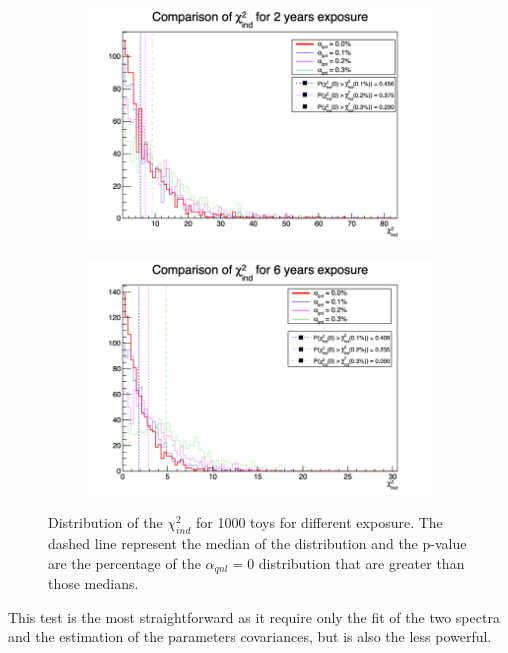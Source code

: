 \documentclass[../main.tex]{subfiles}
\begin{document}
\begin{figure}[th]
  \begin{subfigure}[t]{0.48\linewidth}
    \includegraphics[width=\linewidth]{images/joint_fit/stat_tests/chi2_ind_2y.png}
  \end{subfigure}
  \begin{subfigure}[t]{0.48\linewidth}
    \includegraphics[width=\linewidth]{images/joint_fit/stat_tests/chi2_ind_6y.png}
  \end{subfigure}
  \caption{Distribution of the $\chi^2_{ind}$ for 1000 toys for different exposure. The dashed line represent the median of the distribution and the p-value are the percentage of the $\alpha_{qnl} = 0$ distribution that are greater than those medians.}
  \label{fig:joint_fit:chi2_ind}
\end{figure}

This test is the most straightforward as it require only the fit of the two spectra and the estimation of the parameters covariances, but is also the less powerful.
\end{document}
